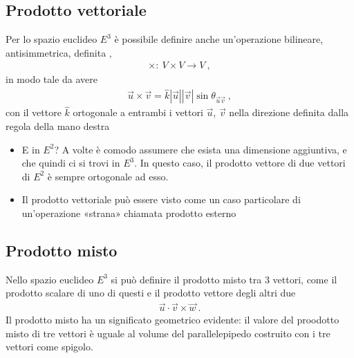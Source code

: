\documentclass[letterpaper,10pt,italian]{jupyterBook}
\begin{document}
\subsection{Prodotto vettoriale}
\label{\detokenize{ch/algebra/vector-algebra-euclidean-space:prodotto-vettoriale}}\label{\detokenize{ch/algebra/vector-algebra-euclidean-space:math-hs-algebra-vector-euclidean-space-vector-product}}
\sphinxAtStartPar
Per lo spazio euclideo \(E^3\) è possibile definire anche un’operazione bilineare, antisimmetrica, definita ,
\begin{equation*}
\begin{split}\times: \ V \times V \rightarrow V \ ,\end{split}
\end{equation*}
\sphinxAtStartPar
in modo tale da avere
\begin{equation*}
\begin{split}\vec{u} \times \vec{v} = \hat{k} |\vec{u}| |\vec{v}| \sin \theta_{\vec{u} \vec{v}} \ ,\end{split}
\end{equation*}
\sphinxAtStartPar
con il vettore \(\hat{k}\) ortogonale a entrambi i vettori \(\vec{u}\), \(\vec{v}\) nella direzione definita dalla regola della mano destra 
\begin{itemize}
\item {} 
\sphinxAtStartPar
{} E in \(E^2\)? A volte è comodo assumere che esista una dimensione aggiuntiva, e che quindi ci si trovi in \(E^3\). In questo caso, il prodotto vettore di due vettori di \(E^2\) è sempre ortogonale ad esso.

\item {} 
\sphinxAtStartPar
{} Il prodotto vettoriale può essere visto come un caso particolare di un’operazione «strana» chiamata prodotto esterno

\end{itemize}


\subsection{Prodotto misto}
\label{\detokenize{ch/algebra/vector-algebra-euclidean-space:prodotto-misto}}\label{\detokenize{ch/algebra/vector-algebra-euclidean-space:math-hs-algebra-vector-euclidean-space-mixed-product}}
\sphinxAtStartPar
Nello spazio euclideo \(E^3\) si può definire il prodotto misto tra 3 vettori, come il prodotto scalare di uno di questi e il prodotto vettore degli altri due
\begin{equation*}
\begin{split}\vec{u} \cdot \vec{v} \times \vec{w} \ .\end{split}
\end{equation*}
\sphinxAtStartPar
Il prodotto misto ha un significato geometrico evidente: il valore del proodotto misto di tre vettori è uguale al volume del parallelepipedo costruito con i tre vettori come spigolo.
\end{document}

